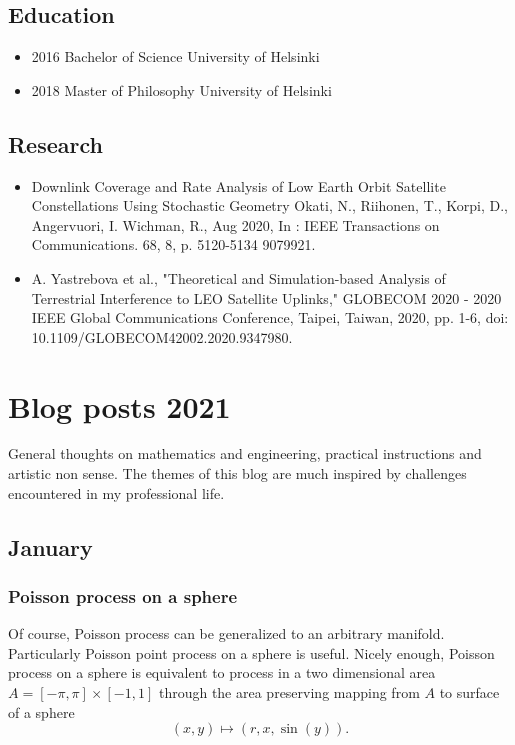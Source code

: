 \documentclass{article}
\begin{document}
\subsection{Education}
\begin{itemize}
\item 2016 Bachelor of Science University of Helsinki\\
\item 2018 Master of Philosophy University of Helsinki
\end{itemize}
\subsection{Research}

\begin{itemize}
\item Downlink Coverage and Rate Analysis of Low Earth Orbit Satellite Constellations Using Stochastic Geometry
  Okati, N., Riihonen, T., Korpi, D., Angervuori, I. Wichman, R., Aug 2020, In : IEEE Transactions on Communications. 68, 8, p. 5120-5134 9079921.\\
\item A. Yastrebova et al., "Theoretical and Simulation-based Analysis of Terrestrial Interference to LEO Satellite Uplinks," GLOBECOM 2020 - 2020 IEEE Global Communications Conference, Taipei, Taiwan, 2020, pp. 1-6, doi: 10.1109/GLOBECOM42002.2020.9347980.
\end{itemize}


\section{Blog posts 2021}
General thoughts on mathematics and engineering, practical instructions and artistic non sense. The themes of this blog are much inspired by challenges encountered in my professional life.

\subsection{January}
\subsubsection{Poisson process on a sphere}
Of course, Poisson process can be generalized to an arbitrary manifold. Particularly Poisson point process on a sphere is useful. Nicely enough, Poisson process on a sphere is equivalent to process in a two dimensional area $ A = [-\pi,\pi] \times [-1,1]$ through the area preserving mapping from $A$ to surface of a sphere
\begin{equation}
  (x,y) \mapsto (r,x,\sin(y)) \nonumber.
\end{equation}
\end{document}

